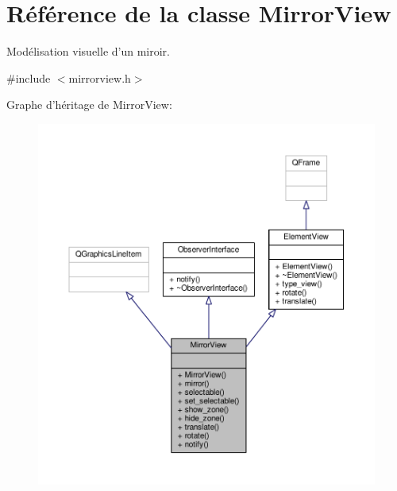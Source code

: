 \hypertarget{classMirrorView}{\section{Référence de la classe Mirror\+View}
\label{classMirrorView}
}


Modélisation visuelle d’un miroir.  




{\ttfamily \#include $<$mirrorview.\+h$>$}



Graphe d'héritage de Mirror\+View\+:
\nopagebreak
\begin{figure}[H]
\begin{center}
\leavevmode
\includegraphics[width=350pt]{d2/d7b/classMirrorView__inherit__graph}
\end{center}
\end{figure}


